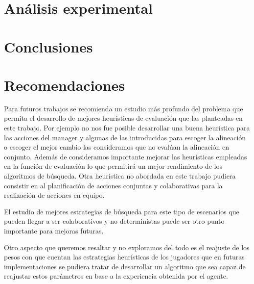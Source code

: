 \documentclass{article}
\begin{document}
\section{Análisis experimental}

\section{Conclusiones}

\section{Recomendaciones}

Para futuros trabajos se recomienda un estudio más profundo del problema que permita el desarrollo de mejores heurísticas de evaluación
que las planteadas en este trabajo. Por ejemplo no nos fue posible desarrollar una buena heurística para las acciones del manager y algunas
de las introducidas para escoger la alineación o escoger el mejor cambio las consideramos que no evalúan la alineación en conjunto.
Además de consideramos importante mejorar las heurísticas empleadas en la función de evaluación lo que permitirá un mejor rendimiento 
de los algoritmos de búsqueda. Otra heurística no abordada en este trabajo pudiera consistir en al planificación de acciones conjuntas y 
colaborativas para la realización de acciones en equipo.

El estudio de mejores estrategias de búsqueda para este tipo de escenarios que pueden llegar a ser colaborativos y no deterministas puede
ser otro punto importante para mejoras futuras.

Otro aspecto que queremos resaltar y no exploramos del todo es el reajuste de los pesos con que cuentan las estrategias heurísticas de los jugadores
que en futuras implementaciones se pudiera tratar de desarrollar un algoritmo que sea capaz de reajustar estos parámetros en base a la experiencia
obtenida por el agente.
\end{document}
